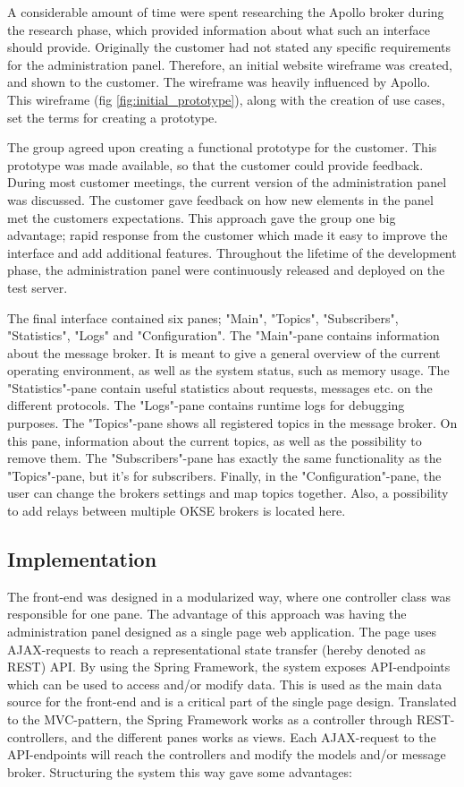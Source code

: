 A considerable amount of time were spent researching the Apollo broker during the research phase, which provided information about what such an interface should provide. Originally the customer had not stated any specific requirements for the administration panel. Therefore, an initial website wireframe was created, and shown to the customer. The wireframe was heavily influenced by Apollo. This wireframe (fig \ref{fig:initial_prototype}), along with the creation of use cases, set the terms for creating a prototype.

The group agreed upon creating a functional prototype for the customer. This prototype was made available, so that the customer could provide feedback. During most customer meetings, the current version of the administration panel was discussed. The customer gave feedback on how new elements in the panel met the customers expectations. This approach gave the group one big advantage; rapid response from the customer which made it easy to improve the interface and add additional features. Throughout the lifetime of the development phase, the administration panel were continuously released and deployed on the test server.

The final interface contained six panes; "Main", "Topics", "Subscribers", "Statistics", "Logs" and "Configuration". The "Main"-pane contains information about the message broker. It is meant to give a general overview of the current operating environment, as well as the system status, such as memory usage. The "Statistics"-pane contain useful statistics about requests, messages etc. on the different protocols. The "Logs"-pane contains runtime logs for debugging purposes. The "Topics"-pane shows all registered topics in the message broker. On this pane, information about the current topics, as well as the possibility to remove them. The "Subscribers"-pane has exactly the same functionality as the "Topics"-pane, but it's for subscribers. Finally, in the "Configuration"-pane, the user can change the brokers settings and map topics together. Also, a possibility to add relays between multiple OKSE brokers is located here. 

\subsection{Implementation}
\label{subsec:architecture_and_implementation-implementation}

The front-end was designed in a modularized way, where one controller class was responsible for one pane. The advantage of this approach was having the administration panel designed as a single page web application. The page uses AJAX-requests to reach a representational state transfer (hereby denoted as REST) API. By using the Spring Framework, the system exposes API-endpoints which can be used to access and/or modify data. This is used as the main data source for the front-end and is a critical part of the single page design. Translated to the MVC-pattern, the Spring Framework works as a controller through REST-controllers, and the different panes works as views. Each AJAX-request to the API-endpoints will reach the controllers and modify the models and/or message broker. Structuring the system this way gave some advantages: 

